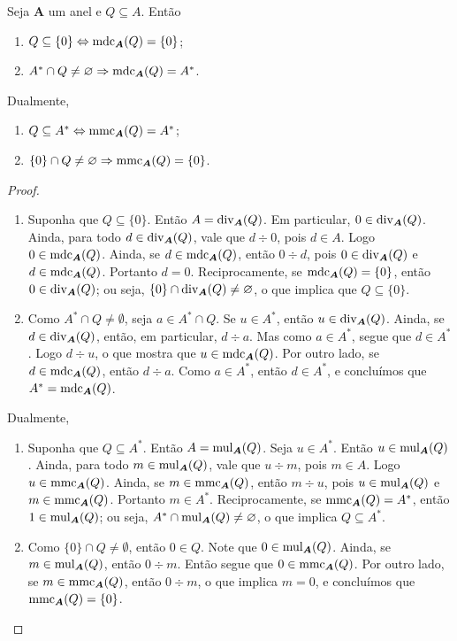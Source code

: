 \begin{prop}
	Seja $\bm A$ um anel e $Q \subseteq A$. Então
	\begin{enumerate}
	\item $Q \subseteq \{0\} \Leftrightarrow \operatorname{mdc}_{\bm A}(Q) = \{0\}$;
	\item $A^* \cap Q \neq \varnothing \Rightarrow \operatorname{mdc}_{\bm A}(Q) = A^*$.
	\end{enumerate}

	Dualmente,
	\begin{enumerate}
	\item $Q \subseteq A^* \Leftrightarrow \operatorname{mmc}_{\bm A}(Q) = A^*$;
	\item $\{0\} \cap Q \neq \varnothing \Rightarrow \operatorname{mmc}_{\bm A}(Q) = \{0\}$.
	\end{enumerate}
\end{prop}
\begin{proof}
	\begin{enumerate}
	\item Suponha que $Q \subseteq \{0\}$. Então $A = \operatorname{div}_{\bm A}(Q)$. Em particular, $0 \in \operatorname{div}_{\bm A}(Q)$. Ainda, para todo $d \in \operatorname{div}_{\bm A}(Q)$, vale que $d \div 0$, pois $d \in A$. Logo $0 \in \operatorname{mdc}_{\bm A}(Q)$. Ainda, se $d \in \operatorname{mdc}_{\bm A}(Q)$, então $0 \div d$, pois $0 \in \operatorname{div}_{\bm A}(Q)$ e $d \in \operatorname{mdc}_{\bm A}(Q)$. Portanto $d=0$. Reciprocamente, se $\operatorname{mdc}_{\bm A}(Q)=\{0\}$, então $0 \in \operatorname{div}_{\bm A}(Q)$; ou seja, $\{0\} \cap \operatorname{div}_{\bm A}(Q) \neq \varnothing$, o que implica que $Q \subseteq \{0\}$.

	\item Como $A^* \cap Q \neq \emptyset$, seja $a \in A^* \cap Q$. Se $u \in A^*$, então $u \in \operatorname{div}_{\bm A}(Q)$. Ainda, se $d \in \operatorname{div}_{\bm A}(Q)$, então, em particular, $d \div a$. Mas como $a \in A^*$, segue que $d \in A^*$. Logo $d \div u$, o que mostra que $u \in \operatorname{mdc}_{\bm A}(Q)$. Por outro lado, se $d \in \operatorname{mdc}_{\bm A}(Q)$, então $d \div a$. Como $a \in A^*$, então $d \in A^*$, e concluímos que $A^*=\operatorname{mdc}_{\bm A}(Q)$.
	\end{enumerate}

	Dualmente,
	\begin{enumerate}
	\item Suponha que $Q \subseteq A^*$. Então $A = \operatorname{mul}_{\bm A}(Q)$. Seja $u \in A^*$. Então $u \in \operatorname{mul}_{\bm A}(Q)$. Ainda, para todo $m \in \operatorname{mul}_{\bm A}(Q)$, vale que $u \div m$, pois $m \in A$. Logo $u \in \operatorname{mmc}_{\bm A}(Q)$. Ainda, se $m \in \operatorname{mmc}_{\bm A}(Q)$, então $m \div u$, pois $u \in \operatorname{mul}_{\bm A}(Q)$ e $m \in \operatorname{mmc}_{\bm A}(Q)$. Portanto $m \in A^*$. Reciprocamente, se $\operatorname{mmc}_{\bm A}(Q)=A^*$, então $1 \in \operatorname{mul}_{\bm A}(Q)$; ou seja, $A^* \cap \operatorname{mul}_{\bm A}(Q) \neq \varnothing$, o que implica $Q \subseteq A^*$.

	\item Como $\{0\} \cap Q \neq \emptyset$, então $0 \in Q$. Note que $0 \in \operatorname{mul}_{\bm A}(Q)$. Ainda, se $m \in \operatorname{mul}_{\bm A}(Q)$, então $0 \div m$. Então segue que $0 \in \operatorname{mmc}_{\bm A}(Q)$. Por outro lado, se $m \in \operatorname{mmc}_{\bm A}(Q)$, então $0 \div m$, o que implica $m=0$, e concluímos que $\operatorname{mmc}_{\bm A}(Q) = \{0\}$.
	\end{enumerate}
\end{proof}



